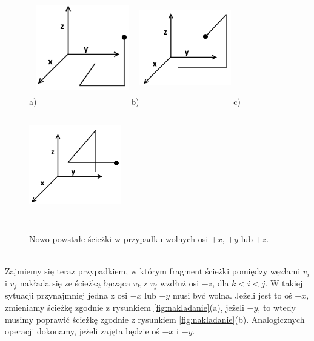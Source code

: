 \documentclass[brudnopis]{xmgr}
\theoremstyle{definition}
\begin{document}
\begin{figure}[ht!]
  \centering
  a)\includegraphics[width=4cm,height=5cm]{rysunki/wolne_x.png}
  b)\includegraphics[width=4cm,height=5cm]{rysunki/wolne_y.png}
  c)\includegraphics[width=4cm,height=5cm]{rysunki/wolne_z.png}
  \caption{Nowo powstałe ścieżki w przypadku wolnych osi $+x$, $+y$ lub $+z$.}
  \label{fig:nowe sciezki}
\end{figure} 
\\\indent Zajmiemy się teraz przypadkiem, w którym fragment ścieżki pomiędzy węzłami $v_i$ i $v_j$ nakłada się ze ścieżką łącząca $v_k$ z $v_j$ wzdłuż osi $-z$, dla $k < i < j$. W takiej sytuacji przynajmniej jedna z osi $-x$ lub $-y$ musi być wolna. Jeżeli jest to oś $-x$, zmieniamy ścieżkę zgodnie z rysunkiem \ref{fig:nakladanie}(a), jeżeli $-y$, to wtedy musimy poprawić ścieżkę zgodnie z rysunkiem \ref{fig:nakladanie}(b). Analogicznych operacji dokonamy, jeżeli zajęta będzie oś $-x$ i $-y$.
\end{document}
